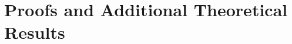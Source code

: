 \documentclass[12pt]{article}
\begin{document}




\normalsize

{}
% 

\newpage
\appendix
\section{Proofs and Additional Theoretical Results}
\label{sec:appendix}


%
%
%
%
\end{document}
